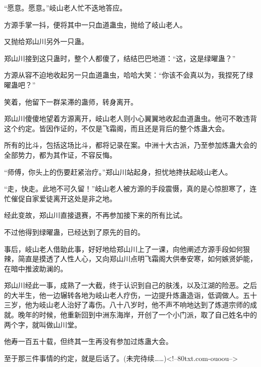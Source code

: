 \begin{this_body}
“愿意。愿意。”岐山老人忙不迭地答应。

方源手掌一抖，便将其中一只血道蛊虫，抛给了岐山老人。

又抛给郑山川另外一只蛊。

郑山川接到这只蛊时，整个人都傻了，结结巴巴地道：“这，这是绿曜蛊？”

方源从容不迫地收起另一只血道蛊虫，哈哈大笑：“你该不会真以为，我捏死了绿曜蛊吧？”

笑着，他留下一群呆滞的蛊师，转身离开。

郑山川傻傻地望着方源离开，岐山老人则小心翼翼地收起血道蛊虫。他可不敢违背这个约定。皆因作证的，不仅是飞霜阁，而且还是背后的整个炼蛊大会。

所有的比斗，包括这场比斗，都将记录在案。中洲十大古派，乃至参加炼蛊大会的全部势力，都为其作证，不容反悔。

“师傅，你头上的伤要赶紧治疗。”郑山川站起身，担忧地搀扶起岐山老人。

“走，快走。此地不可久留！”岐山老人被方源的手段震慑，真的是心惊胆寒了，连忙催促自家爱徒离开这处是非之地。

经此变故，郑山川直接退赛，不再参加接下来的所有比试。

不过他得到绿曜蛊，已经达到了原先的目的。

事后，岐山老人借助此事，好好地给郑山川上了一课，向他阐述方源手段如何狠辣，简直是摸透了人性人心，又向郑山川点明飞霜阁大供奉安寒，如何嫉贤妒能，在暗中推波助澜的。

郑山川经此一事，成熟了一大截，终于认识到自己的肤浅，以及江湖的险恶。之后的大半生，他一边辗转各地为岐山老人疗伤，一边提升炼蛊造诣，低调做人。五十三岁，他为岐山老人治好了毒伤。八十八岁时，他不声不响地达到了炼道宗师的成就。晚年的时候，他重新回到中洲东海岸，开创了一个小门派，取了自己姓名中的两个字，就叫做山川堂。

他寿一百五十载，但终其一生再没有参加过炼蛊大会。

至于那三件事情的约定，就是后话了。(未完待续……)<!--80txt.com-ouoou-->

\end{this_body}

